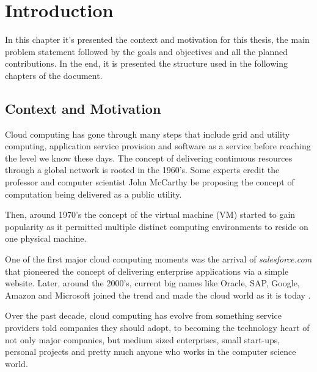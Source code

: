 \newcommand{\novathesis}{\emph{novathesis}}
\newcommand{\novathesisclass}{\texttt{novathesis.cls}}


\chapter{Introduction}
\label{cha:introduction}

In this chapter it's presented the context and motivation for this thesis, the main problem statement followed by the goals and objectives and all the planned contributions. In the end, it is presented the structure used in the following chapters of the document.

\section{Context and Motivation} %
\label{sec:context_and_motivation}

Cloud computing has gone through many steps that include grid and utility computing, application service provision and software as a service before reaching the level we know these days. The concept of delivering continuous resources through a global network is rooted in the 1960's. Some experts credit the professor and computer scientist John McCarthy \cite{john_mcCarthy:1} be proposing the concept of computation being delivered as a public utility.

Then, around 1970's the concept of the virtual machine (\gls{VM}) started to gain popularity as it permitted multiple distinct computing environments to reside on one physical machine.

One of the first major cloud computing moments was the arrival of \textit{salesforce.com} that pioneered the concept of delivering enterprise applications via a simple website. Later, around the 2000's, current big names like Oracle, SAP, Google, Amazon and Microsoft joined the trend and made the cloud world as it is today \cite{cloud_history:1, cloud_history:2}.

Over the past decade, cloud computing has evolve from something service providers told companies they should adopt, to becoming the technology heart of not only major companies, but medium sized enterprises, small start-ups, personal projects and pretty much anyone who works in the computer science world. 

